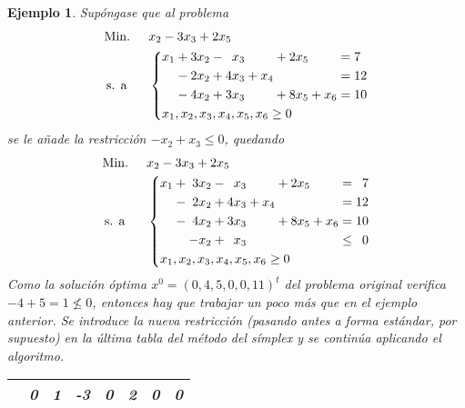 \documentclass[11pt]{report}
\theoremstyle{mytheorem}
\theoremstyle{mydefinition}
\theoremstyle{myexample}
\newtheorem*{example}{Ejemplo}
\begin{document}
\begin{example}
Supóngase que al problema
\[\begin{aligned}[t]
&\text{Min. } && x_2-3x_3+2x_5 \\
& \, \text{s. a} &&\left\{\begin{alignedat}{10}
& &x_1 & {}+{} & 3x_2 & {}-{} &  &x_3 &       &     & {}+{} & 2x_5 &       &     & {}={} & 7 \\
& &    & {}-{} & 2x_2 & {}+{} & 4&x_3 & {}+{} & x_4 &       &      &       &     & {}={} & 12 \\
& &    & {}-{} & 4x_2 & {}+{} & 3&x_3 &       &     & {}+{} & 8x_5 & {}+{} & x_6 & {}={} & 10 \\
&\mathrlap{x_1,x_2,x_3,x_4,x_5,x_6 \geq 0}
\end{alignedat}\right.
\end{aligned}\]
se le añade la restricción $-x_2+x_3 \leq 0$, quedando
\[\begin{aligned}[t]
&\text{Min. } && x_2-3x_3+2x_5 \\
& \, \text{s. a} &&\left\{\begin{alignedat}{10}
& &x_1 & {}+{} & 3&x_2 & {}-{} &  &x_3 &       &     & {}+{} & 2x_5 &       &     & {}={} & 7 \\
& &    & {}-{} & 2&x_2 & {}+{} & 4&x_3 & {}+{} & x_4 &       &      &       &     & {}={} & 12 \\
& &    & {}-{} & 4&x_2 & {}+{} & 3&x_3 &       &     & {}+{} & 8x_5 & {}+{} & x_6 & {}={} & 10 \\
& &    &       & -&x_2 & {}+{} &  &x_3 &       &     &       &      &       &     & {}\leq{} & 0 \\
&\mathrlap{x_1,x_2,x_3,x_4,x_5,x_6 \geq 0}
\end{alignedat}\right.
\end{aligned}\]
Como la solución óptima $x^0 = (0,4,5,0,0,11)^t$ del problema original verifica $-4+5=1 \not\leq 0$, entonces hay que trabajar un poco más que en el ejemplo anterior. Se introduce la nueva restricción (pasando antes a forma estándar, por supuesto) en la última tabla del método del símplex y se continúa aplicando el algoritmo. 

\begin{center}
\begin{tabular}{|c|c|c|c|c|c|c|c|}
    \cline{2-8}
    
    \multicolumn{1}{c|}{} & \multicolumn{1}{c}{\phantom{-}0} & \multicolumn{1}{c}{\phantom{-}1} & \multicolumn{1}{c}{-3} & \multicolumn{1}{c}{\phantom{-}0} & \multicolumn{1}{c}{\phantom{-}2} & \multicolumn{1}{c}{0} & \multicolumn{1}{c|}{\phantom{-}0} \\ \hline
    

\end{tabular}
\end{center}
\end{example}
\end{document}
